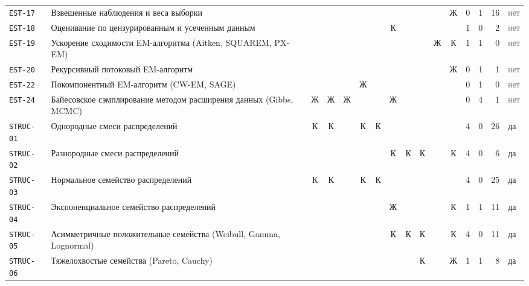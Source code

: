 \documentclass[10pt,a4paper]{article}
\begin{document}
\begin{landscape}
{\begin{longtable}{@{}l >{\raggedright\arraybackslash}p{8.2cm} *{10}{c} r r r l@{}}
\texttt{EST-17} & Взвешенные наблюдения и веса выборки &  &  &  &  &  &  &  &  &  & \cellcolor{hm!22}Ж & 0 & 1 & 16 & \textcolor{gray}{нет} \\
\texttt{EST-18} & Оценивание по цензурированным и усеченным данным &  &  &  &  &  & \cellcolor{hm!70}К &  &  &  &  & 1 & 0 & 2 & \textcolor{gray}{нет} \\
\texttt{EST-19} & Ускорение сходимости EM-алгоритма (Aitken, SQUAREM, PX-EM) &  &  &  &  &  &  &  &  & \cellcolor{hm!22}Ж & \cellcolor{hm!70}К & 1 & 1 & 0 & \textcolor{gray}{нет} \\
\texttt{EST-20} & Рекурсивный потоковый EM-алгоритм &  &  &  &  &  &  &  &  &  & \cellcolor{hm!22}Ж & 0 & 1 & 1 & \textcolor{gray}{нет} \\
\texttt{EST-22} & Покомпонентный EM-алгоритм (CW-EM, SAGE) &  &  &  & \cellcolor{hm!22}Ж &  &  &  &  &  &  & 0 & 1 & 0 & \textcolor{gray}{нет} \\
\texttt{EST-24} & Байесовское сэмплирование методом расширения данных (Gibbs, MCMC) & \cellcolor{hm!22}Ж & \cellcolor{hm!22}Ж & \cellcolor{hm!22}Ж &  &  & \cellcolor{hm!22}Ж &  &  &  &  & 0 & 4 & 1 & \textcolor{gray}{нет} \\
\texttt{STRUC-01} & Однородные смеси распределений & \cellcolor{hm!70}К & \cellcolor{hm!70}К &  & \cellcolor{hm!70}К & \cellcolor{hm!70}К &  &  &  &  &  & 4 & 0 & 26 & \cellcolor{yes!30}да \\
\texttt{STRUC-02} & Разнородные смеси распределений &  &  &  &  &  & \cellcolor{hm!70}К & \cellcolor{hm!70}К & \cellcolor{hm!70}К &  & \cellcolor{hm!70}К & 4 & 0 & 6 & \cellcolor{yes!30}да \\
\texttt{STRUC-03} & Нормальное семейство распределений & \cellcolor{hm!70}К & \cellcolor{hm!70}К &  & \cellcolor{hm!70}К & \cellcolor{hm!70}К &  &  &  &  &  & 4 & 0 & 25 & \cellcolor{yes!30}да \\
\texttt{STRUC-04} & Экспоненциальное семейство распределений &  &  &  &  &  & \cellcolor{hm!22}Ж &  &  &  & \cellcolor{hm!70}К & 1 & 1 & 11 & \cellcolor{yes!30}да \\
\texttt{STRUC-05} & Асимметричные положительные семейства (Weibull, Gamma, Lognormal) &  &  &  &  &  & \cellcolor{hm!70}К & \cellcolor{hm!70}К & \cellcolor{hm!70}К &  & \cellcolor{hm!70}К & 4 & 0 & 11 & \cellcolor{yes!30}да \\
\texttt{STRUC-06} & Тяжелохвостые семейства (Pareto, Cauchy) &  &  &  &  &  &  &  & \cellcolor{hm!70}К &  & \cellcolor{hm!22}Ж & 1 & 1 & 8 & \cellcolor{yes!30}да \\

\end{longtable}}
\end{landscape}
\end{document}
